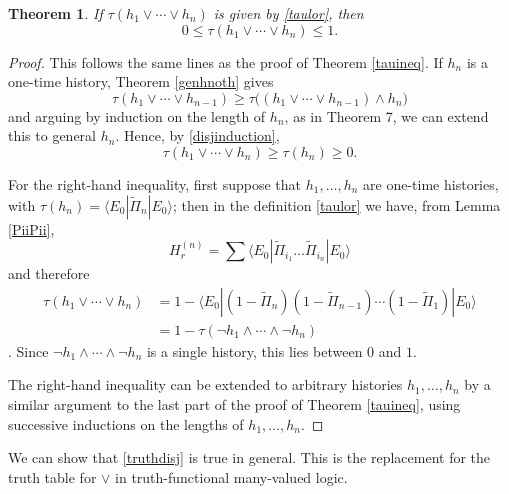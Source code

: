 \documentclass[12pt,a4paper,reqno]{article}
\renewcommand{\(}{\left(}
\renewcommand{\)}{\right)}
\newcommand{\<}{\langle}
\renewcommand{\>}{\rangle}
\newcommand{\Pii}{\widetilde{\Pi}}
\theoremstyle{plain} %
\newtheorem{thm}{Theorem}
\begin{document}
\begin{thm} If $\tau(h_1\lor\cdots\lor h_n)$ is given by \eqref{taulor}, then
\[
0 \le \tau(h_1\lor\cdots\lor h_n) \le 1.
\]
\end{thm}
\begin{proof}
This follows the same lines as the proof of Theorem \ref{tauineq}. If $h_n$ is a one-time history, Theorem \ref{genhnoth} gives
\[
\tau(h_1\lor\cdots\lor h_{n-1}) \ge \tau\big((h_1\lor\cdots\lor h_{n-1})\land h_n\big)
\]
and arguing by induction on the length of $h_n$, as in Theorem 7, we can extend this to general $h_n$. Hence, by \eqref{disjinduction},
\[
\tau(h_1\lor\cdots\lor h_n) \ge \tau(h_n) \ge 0.
\]

For the right-hand inequality, first suppose that $h_1,\ldots,h_n$ are one-time histories, with $\tau(h_n) = \<E_0|\Pii_n|E_0\>$; then in the definition \eqref{taulor} we have, from Lemma \ref{PiiPii},
\[
H_r^{(n)} = \sum \<E_0|\Pii_{i_1}\ldots \Pii_{i_n}|E_0\>
\]
and therefore
\begin{align*}
\tau(h_1\lor\cdots\lor h_n) &= 1 - \<E_0|(1 - \Pii_n)(1 - \Pii_{n-1})\cdots(1-\Pii_1)|E_0\>\\
&= 1 - \tau(\lnot h_1\land\cdots\land\lnot h_n)
\end{align*}.
Since $\lnot h_1\land\cdots\land\lnot h_n$ is a single history, this lies between $0$ and $1$.

The right-hand inequality can be extended to arbitrary histories $h_1,\ldots,h_n$ by a similar argument to the last part of the proof of Theorem \ref{tauineq}, using successive inductions on the lengths of $h_1,\ldots,h_n$.
\end{proof}

We can show that \eqref{truthdisj} is true in general. This is the replacement for the truth table for $\lor$ in truth-functional many-valued logic.
\end{document}
